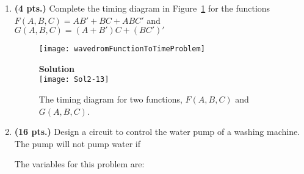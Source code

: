 \begin{enumerate}
                    \item \textbf{ (4 pts.)} Complete the timing diagram in Figure~\ref{fig:HWtime}
                        for the functions
                        $F(A,B,C) = AB' + BC + ABC'$ and $G(A,B,C) = (A+B')C + (BC')'$

                        \begin{figure}[ht]
                            \begin{onlyproblem}
                                \texttt{[image: wavedromFunctionToTimeProblem]}
                            \end{onlyproblem}
                            \begin{onlysolution}  \textbf{Solution}\\
                                \texttt{[image: Sol2-13]}
                            \end{onlysolution}
                            \caption{The timing diagram for two functions, $F(A,B,C)$ and $G(A,B,C)$.}
                            \label{fig:HWtime}
                        \end{figure}
                        \filbreak
                    \item\textbf{ (16 pts.)} Design a circuit to control
                        the water pump of a washing machine.  The pump will not pump
                        water if

                        The variables for this problem are:


\end{enumerate}
